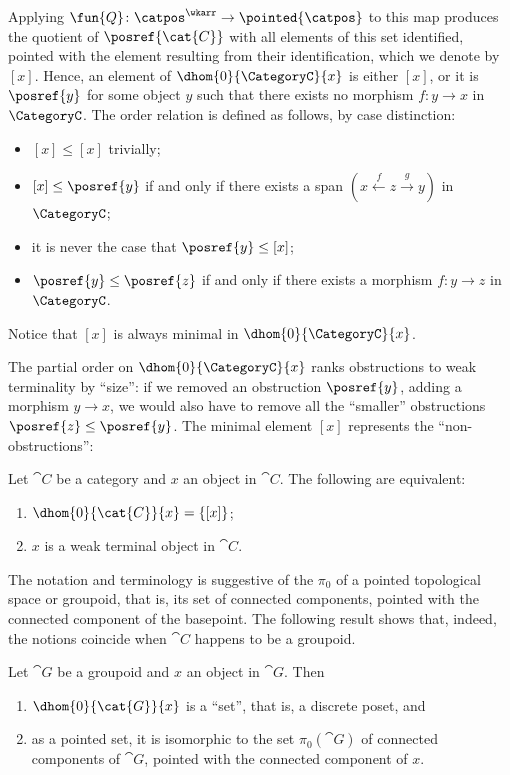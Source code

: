     Applying $\fun{Q}\colon \catpos^\wkarr \to \pointed{\catpos}$ to this map produces the quotient of $\posref{\cat{C}}$ with all elements of this set identified, pointed with the element resulting from their identification, which we denote by $[x]$.
    Hence, an element of $\dhom{0}{\CategoryC}{x}$ is either $[x]$, or it is $\posref{y}$ for some object $y$ such that there exists no morphism $f\colon y \to x$ in $\CategoryC$.
    The order relation is defined as follows, by case distinction:
    \begin{itemize}
        \item $[x] \leq [x]$ trivially;
        \item $[x] \leq \posref{y}$ if and only if there exists a span $(x \xleftarrow{f} z \xrightarrow{g} y)$ in $\CategoryC$;
        \item it is never the case that $\posref{y} \leq [x]$;
        \item $\posref{y} \leq \posref{z}$ if and only if there exists a morphism $f\colon y \to z$ in $\CategoryC$.
    \end{itemize}
    Notice that $[x]$ is always minimal in $\dhom{0}{\CategoryC}{x}$.

The partial order on $\dhom{0}{\CategoryC}{x}$ ranks obstructions to weak terminality by ``size'': if we removed an obstruction $\posref{y}$, adding a morphism $y \to x$, we would also have to remove all the ``smaller'' obstructions $\posref{z} \leq \posref{y}$.
The minimal element $[x]$ represents the ``non-obstructions'':
\begin{proposition} \label{prop:dhom0_trivial_when_weak_terminal}
Let $\cat{C}$ be a category and $x$ an object in $\cat{C}$.
The following are equivalent:
\begin{enumerate}[label=(\alph*)]
    \item $\dhom{0}{\cat{C}}{x} = \{[x]\}$;
    \item $x$ is a weak terminal object in $\cat{C}$.
\end{enumerate}
\end{proposition}

The notation and terminology is suggestive of the $\pi_0$ of a pointed topological space or groupoid, that is, its set of connected components, pointed with the connected component of the basepoint. 
The following result shows that, indeed, the notions coincide when $\cat{C}$ happens to be a groupoid.

\begin{proposition}\label{prop: dhom0 is pi0 for groupoids}
    Let $\cat{G}$ be a groupoid and $x$ an object in $\cat{G}$.
    Then
    \begin{enumerate}
        \item $\dhom{0}{\cat{G}}{x}$ is a ``set'', that is, a discrete poset, and
        \item as a pointed set, it is isomorphic to the set $\pi_0(\cat{G})$ of connected components of $\cat{G}$, pointed with the connected component of $x$.
    \end{enumerate}
\end{proposition}
